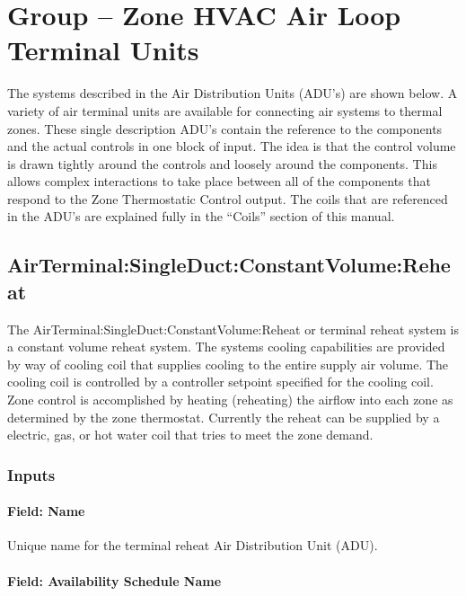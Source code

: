 \section{Group -- Zone HVAC Air Loop Terminal Units}\label{group-zone-HVAC-air-loop-terminal-units}

The systems described in the Air Distribution Units (ADU's) are shown below. A variety of air terminal units are available for connecting air systems to thermal zones. These single description ADU's contain the reference to the components and the actual controls in one block of input. The idea is that the control volume is drawn tightly around the controls and loosely around the components. This allows complex interactions to take place between all of the components that respond to the Zone Thermostatic Control output. The coils that are referenced in the ADU's are explained fully in the ``Coils'' section of this manual.

\subsection{AirTerminal:SingleDuct:ConstantVolume:Reheat}\label{airterminalsingleductconstantvolumereheat}

The AirTerminal:SingleDuct:ConstantVolume:Reheat or terminal reheat system is a constant volume reheat system. The systems cooling capabilities are provided by way of cooling coil that supplies cooling to the entire supply air volume. The cooling coil is controlled by a controller setpoint specified for the cooling coil. Zone control is accomplished by heating (reheating) the airflow into each zone as determined by the zone thermostat. Currently the reheat can be supplied by a electric, gas, or hot water coil that tries to meet the zone demand.

\subsubsection{Inputs}

\paragraph{Field: Name}

Unique name for the terminal reheat Air Distribution Unit (ADU).

\paragraph{Field: Availability Schedule Name}


